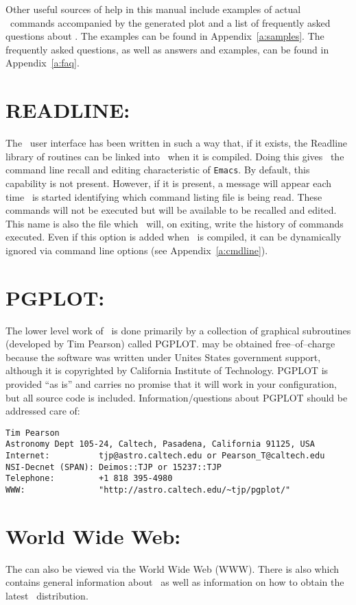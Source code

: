 Other useful sources of help in this manual include examples of
actual \wip\ commands accompanied by the generated plot and
a list of frequently asked questions about \wip.
The examples can be found in Appendix~\ref{a:samples}.
The frequently asked questions, as well as answers and examples,
can be found in Appendix~\ref{a:faq}.

\section*{READLINE:}
The \wip\ user interface has been written in such a way that,
if it exists,
the Readline library%
of routines can be linked into \wip\ when it is compiled.
Doing this gives \wip\ the command line recall and editing
characteristic of {\tt Emacs}.
By default, this capability is not present.
However, if it is present, a message will appear each time \wip\ is
started identifying which command listing file is being read.
These commands will not be executed but will be available to be recalled
and edited.
This name is also the file which \wip\ will, on exiting, write the
history of commands executed.
Even if this option is added when \wip\ is compiled,
it can be dynamically ignored via command line options
(see Appendix~\ref{a:cmdline}).

\section*{PGPLOT:}
The lower level work of \wip\ is done primarily by a collection of graphical
subroutines (developed by Tim Pearson) called PGPLOT.
may be obtained free--of--charge because the software was written
under Unites States government support, although it is copyrighted by
California Institute of Technology.
PGPLOT is provided ``as is'' and carries no promise that it
will work in your configuration, but all source code is included.
Information/questions about PGPLOT should be addressed care of:
\begin{verbatim}
Tim Pearson
Astronomy Dept 105-24, Caltech, Pasadena, California 91125, USA
Internet:          tjp@astro.caltech.edu or Pearson_T@caltech.edu
NSI-Decnet (SPAN): Deimos::TJP or 15237::TJP
Telephone:         +1 818 395-4980
WWW:               "http://astro.caltech.edu/~tjp/pgplot/"
\end{verbatim}

\section*{World Wide Web:}
The
can also be viewed via the World Wide Web (WWW).
There is also
which contains general information about \wip\ as well as information on
how to obtain the latest \wip\ distribution.
